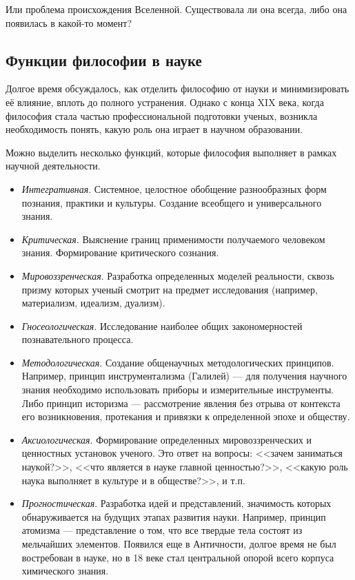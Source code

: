 Или проблема происхождения Вселенной. Существовала ли она всегда, либо она появилась в какой-то момент?
        

	\subsection{Функции философии в науке} 

Долгое время обсуждалось, как отделить философию от науки и минимизировать её влияние, вплоть до полного устранения. Однако с конца XIX века, когда философия стала частью профессиональной подготовки ученых, возникла необходимость понять, какую роль она играет в научном образовании. 

Можно выделить несколько функций, которые философия выполняет в рамках научной деятельности.
\begin{itemize}
    \item \textit{Интегративная}. 
    Системное, целостное обобщение разнообразных форм познания, практики и культуры. Создание всеобщего и универсального знания.

    \item \textit{Критическая}. 
    Выяснение границ применимости получаемого человеком знания. Формирование критического сознания.  

    \item \textit{Мировоззренческая}. 
    Разработка определенных моделей реальности, сквозь призму которых ученый смотрит на предмет исследования (например, материализм, идеализм, дуализм).

    \item \textit{Гносеологическая}. 
    Исследование наиболее общих закономерностей познавательного процесса.

    \item \textit{Методологическая}. 
    Создание общенаучных методологических принципов. 
    Например, принцип инструментализма (Галилей) --- для получения научного знания необходимо использовать приборы и измерительные инструменты.
    Либо принцип историзма --- рассмотрение явления без отрыва от контекста его возникновения, протекания и привязки к определенной эпохе и обществу.
    
    \item \textit{Аксиологическая}. 
    Формирование определенных мировоззренческих и ценностных установок ученого. Это ответ на вопросы: <<зачем заниматься наукой?>>, <<что является в науке главной ценностью?>>, <<какую роль наука выполняет в культуре и в обществе?>>, и т.п.

    \item \textit{Прогностическая}. 
    Разработка идей и представлений, значимость которых обнаруживается на будущих этапах развития науки. 
    Например, принцип атомизма --- представление о том, что все твердые тела состоят из мельчайших элементов. Появился еще в Античности, долгое время не был востребован в науке, но в 18 веке стал центральной опорой всего корпуса химического знания. 
\end{itemize}
	
